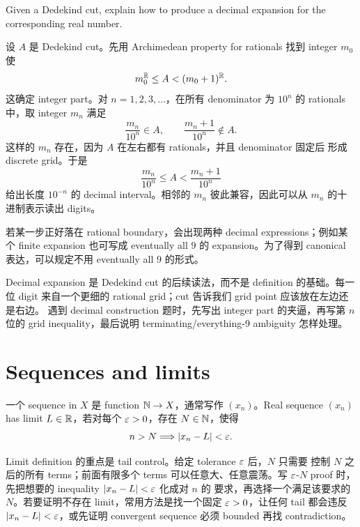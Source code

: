 \begin{exerciseblock}
Given a Dedekind cut, explain how to produce a decimal expansion for the
corresponding real number.
\end{exerciseblock}

\begin{solution}
设 \(A\) 是 Dedekind cut。先用 Archimedean property for rationals 找到 integer
\(m_0\) 使
\[
  m_0^{\mathbb{R}}\leq A<(m_0+1)^{\mathbb{R}}.
\]
这确定 integer part。对 \(n=1,2,3,\ldots\)，在所有 denominator 为 \(10^n\) 的
rationals 中，取 integer \(m_n\) 满足
\[
  \frac{m_n}{10^n}\in A,\qquad
  \frac{m_n+1}{10^n}\notin A.
\]
这样的 \(m_n\) 存在，因为 \(A\) 在左右都有 rationals，并且 denominator 固定后
形成 discrete grid。于是
\[
  \frac{m_n}{10^n}\leq A<\frac{m_n+1}{10^n}
\]
给出长度 \(10^{-n}\) 的 decimal interval。相邻的 \(m_n\) 彼此兼容，因此可以从
\(m_n\) 的十进制表示读出 digits。

若某一步正好落在 rational boundary，会出现两种 decimal expressions；例如某个
finite expansion 也可写成 eventually all \(9\) 的 expansion。为了得到 canonical
表达，可以规定不用 eventually all \(9\) 的形式。
\end{solution}

\begin{explanation}
Decimal expansion 是 Dedekind cut 的后续读法，而不是 definition 的基础。每一位
digit 来自一个更细的 rational grid；cut 告诉我们 grid point 应该放在左边还是右边。
遇到 decimal construction 题时，先写出 integer part 的夹逼，再写第 \(n\) 位的
grid inequality，最后说明 terminating/everything-9 ambiguity 怎样处理。
\end{explanation}

\section{Sequences and limits}

\begin{definition}
一个 sequence in \(X\) 是 function \(\mathbb{N}\to X\)，通常写作 \((x_n)\)。Real sequence
\((x_n)\) has limit \(L\in\mathbb{R}\)，若对每个 \(\varepsilon>0\)，存在 \(N\in\mathbb{N}\)，使得
\[
  n>N \Longrightarrow |x_n-L|<\varepsilon.
\]
\end{definition}

Limit definition 的重点是 tail control。给定 tolerance \(\varepsilon\) 后，\(N\) 只需要
控制 \(N\) 之后的所有 terms；前面有限多个 terms 可以任意大、任意震荡。写
\(\varepsilon\)-\(N\) proof 时，先把想要的 inequality \(|x_n-L|<\varepsilon\) 化成对 \(n\) 的
要求，再选择一个满足该要求的 \(N\)。若要证明不存在 limit，常用方法是找一个固定
\(\varepsilon>0\)，让任何 tail 都会违反 \(|x_n-L|<\varepsilon\)，或先证明 convergent sequence
必须 bounded 再找 contradiction。

